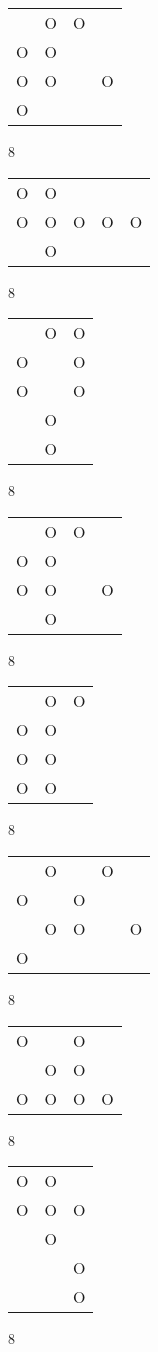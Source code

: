\begin{tabular}{|m{0.2cm}m{0.2cm}m{0.2cm}m{0.2cm}|}\hline
 &O&O& \\
O&O& & \\
O&O& &O\\
O& & & \\
\hline\end{tabular}8
\begin{tabular}{|m{0.2cm}m{0.2cm}m{0.2cm}m{0.2cm}m{0.2cm}|}\hline
O&O& & & \\
O&O&O&O&O\\
 &O& & & \\
\hline\end{tabular}8
\begin{tabular}{|m{0.2cm}m{0.2cm}m{0.2cm}|}\hline
 &O&O\\
O& &O\\
O& &O\\
 &O& \\
 &O& \\
\hline\end{tabular}8
\begin{tabular}{|m{0.2cm}m{0.2cm}m{0.2cm}m{0.2cm}|}\hline
 &O&O& \\
O&O& & \\
O&O& &O\\
 &O& & \\
\hline\end{tabular}8
\begin{tabular}{|m{0.2cm}m{0.2cm}m{0.2cm}|}\hline
 &O&O\\
O&O& \\
O&O& \\
O&O& \\
\hline\end{tabular}8
\begin{tabular}{|m{0.2cm}m{0.2cm}m{0.2cm}m{0.2cm}m{0.2cm}|}\hline
 &O& &O& \\
O& &O& & \\
 &O&O& &O\\
O& & & & \\
\hline\end{tabular}8
\begin{tabular}{|m{0.2cm}m{0.2cm}m{0.2cm}m{0.2cm}|}\hline
O& &O& \\
 &O&O& \\
O&O&O&O\\
\hline\end{tabular}8
\begin{tabular}{|m{0.2cm}m{0.2cm}m{0.2cm}|}\hline
O&O& \\
O&O&O\\
 &O& \\
 & &O\\
 & &O\\
\hline\end{tabular}8
